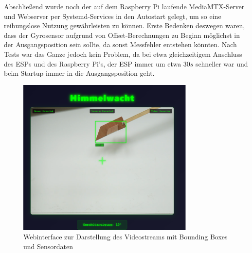 Abschließend wurde noch der auf dem Raspberry Pi laufende MediaMTX-Server und Webserver per Systemd-Services in den Autostart gelegt, um so eine reibungslose Nutzung gewährleisten zu können. Erste Bedenken deswegen waren, dass der Gyrosensor aufgrund von Offset-Berechnungen zu Beginn möglichst in der Ausgangsposition sein sollte, da sonst Messfehler entstehen könnten. Nach Tests war das Ganze jedoch kein Problem, da bei etwa gleichzeitigem Anschluss des ESPs und des Raspberry Pi's, der ESP immer um etwa $30s$ schneller war und beim Startup immer in die Ausgangsposition geht.
\begin{figure}[H]
    \begin{center}
        \includegraphics[width=0.8\textwidth]{images/Webserver.png}
        \caption{Webinterface zur Darstellung des Videostreams mit Bounding Boxes und Sensordaten}
        \label{fig:webserver}
    \end{center}
\end{figure}